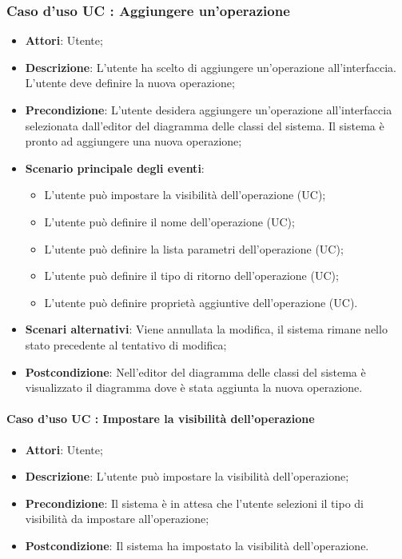 \documentclass[../AnalisiDeiRequisiti.tex]{subfiles}
\begin{document}
		\subsubsection{Caso d'uso UC : Aggiungere un'operazione}
			\begin{itemize}
				\item \textbf{Attori}: Utente;
				\item \textbf{Descrizione}: L'utente ha scelto di aggiungere un'operazione
				all'interfaccia. L'utente deve definire la nuova operazione;
				\item \textbf{Precondizione}: L'utente desidera aggiungere un'operazione
				all'interfaccia selezionata dall'editor del diagramma delle classi del
				sistema. Il sistema è pronto ad aggiungere una nuova operazione;
				\item \textbf{Scenario principale degli eventi}:
					\begin{itemize}
						\item L'utente può impostare la visibilità dell'operazione (UC);
						\item L'utente può definire il nome dell'operazione (UC);
						\item L'utente può definire la lista parametri dell'operazione (UC);
						\item L'utente può definire il tipo di ritorno dell'operazione (UC);
						\item L'utente può definire proprietà aggiuntive dell'operazione (UC).
					\end{itemize}
				\item \textbf{Scenari alternativi}: Viene annullata la modifica, il sistema
				rimane nello stato precedente al tentativo di modifica;
				\item \textbf{Postcondizione}: Nell'editor del diagramma delle classi del
				sistema è visualizzato il diagramma dove è stata aggiunta la nuova operazione.
			\end{itemize}
		\paragraph{Caso d'uso UC : Impostare la visibilità dell'operazione}
			\begin{itemize}
				\item \textbf{Attori}: Utente;
				\item \textbf{Descrizione}: L'utente può impostare la visibilità
				dell'operazione;
				\item \textbf{Precondizione}: Il sistema è in attesa che l'utente selezioni il
				tipo di visibilità da impostare all'operazione;
				\item \textbf{Postcondizione}: Il sistema ha impostato la visibilità
				dell'operazione.
			\end{itemize}
\end{document}
